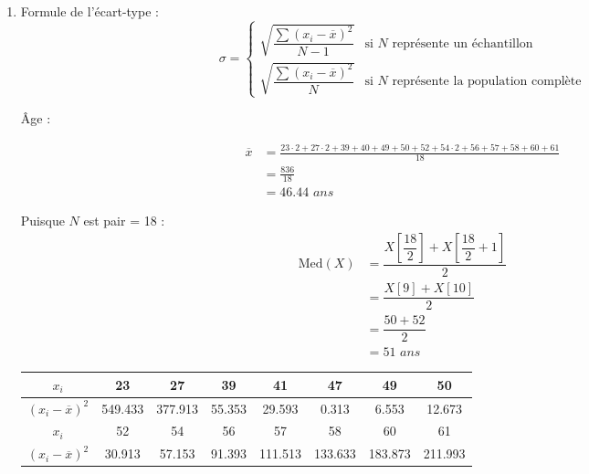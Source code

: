 \documentclass{article}
\begin{document}
\begin{enumerate}

\item Formule de l'écart-type :
    \[
    \sigma =
    \begin{cases}
        \sqrt{\dfrac{\sum (x_i - \overline{x})^2}{N-1}} & \text{si } N \text{ représente un échantillon} \\[0.5cm]
        \sqrt{\dfrac{\sum (x_i - \overline{x})^2}{N}} & \text{si } N \text{ représente la population complète}
    \end{cases}
    \]


Âge : 

\begin{align*}
        \overline{x} &= \frac{23\cdot2+27\cdot2+39+40+49+50+52+54\cdot2+56+57+58+60+61}{18}\\ 
                     &= \frac{836}{18}\\
                     &= \boxed { 46.44 \textit{ ans}}
    \end{align*}

    \vspace{0.5cm}

Puisque \(N\) est pair = 18 :
    \begin{align*}
        \text{Med}(X) &= \dfrac{X\!\left[\dfrac{18}{2}\right] + X\!\left[\dfrac{18}{2} + 1\right]}{2} \\[0.3cm]
                      &= \dfrac{X\!\left[9\right] + X\!\left[10\right]}{2} \\[0.3cm]
                      &= \dfrac{50 + 52}{2} \\[0.3cm]
                      &=\boxed{51\textit{ ans}}
    \end{align*}

\vspace{0.15cm}
\begin{center}
\begin{tabular}{ |c|c|c|c|c|c|c|c|} 
    \hline
    \(x_i\) & 23 & 27 & 39 & 41 &47 &49 & 50\\
    \hline
    \((x_i - \overline{x})^2\) & 549.433 & 377.913 & 55.353 & 29.593 & 0.313 & 6.553 & 12.673  \\
    \hline
    \(x_i\) & 52 & 54 & 56 & 57 & 58 & 60 & 61\\
    \hline
    \((x_i - \overline{x})^2\) & 30.913 & 57.153 & 91.393 & 111.513 & 133.633 & 183.873 & 211.993  \\
    \hline
\end{tabular}
\end{center}


\end{enumerate}
\end{document}
